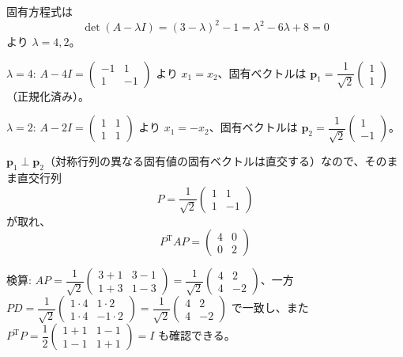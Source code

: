 
固有方程式は
\[
\det(A - \lambda I) = (3-\lambda)^{2} - 1 = \lambda^{2} - 6\lambda + 8 = 0
\]
より $\lambda = 4, 2$。

$\lambda = 4$: $A - 4I = \begin{pmatrix} -1 & 1 \\ 1 & -1 \end{pmatrix}$ より $x_1 = x_2$、固有ベクトルは $\bm{p}_1 = \dfrac{1}{\sqrt{2}}\begin{pmatrix}1\\1\end{pmatrix}$（正規化済み）。

$\lambda = 2$: $A - 2I = \begin{pmatrix} 1 & 1 \\ 1 & 1 \end{pmatrix}$ より $x_1 = -x_2$、固有ベクトルは $\bm{p}_2 = \dfrac{1}{\sqrt{2}}\begin{pmatrix}1\\-1\end{pmatrix}$。

$\bm{p}_1 \perp \bm{p}_2$（対称行列の異なる固有値の固有ベクトルは直交する）なので、そのまま直交行列
\[
P = \frac{1}{\sqrt{2}}\begin{pmatrix} 1 & 1 \\ 1 & -1 \end{pmatrix}
\]
が取れ、
\[
\boxed{\; P^{\mathrm{T}} A P = \begin{pmatrix} 4 & 0 \\ 0 & 2 \end{pmatrix} \;}
\]

検算: $AP = \dfrac{1}{\sqrt2}\begin{pmatrix}3+1 & 3-1\\1+3 & 1-3\end{pmatrix} = \dfrac{1}{\sqrt2}\begin{pmatrix}4 & 2\\4 & -2\end{pmatrix}$、一方 $PD = \dfrac{1}{\sqrt2}\begin{pmatrix}1\cdot4 & 1\cdot2\\1\cdot4 & -1\cdot2\end{pmatrix} = \dfrac{1}{\sqrt2}\begin{pmatrix}4&2\\4&-2\end{pmatrix}$ で一致し、また $P^{\mathrm{T}}P = \dfrac12\begin{pmatrix}1+1 & 1-1\\1-1&1+1\end{pmatrix} = I$ も確認できる。
